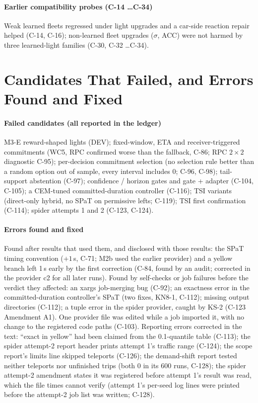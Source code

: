 \paragraph{Earlier compatibility probes (C-14 \dots C-34)} Weak learned fleets regressed under light upgrades and a car-side reaction repair
helped (C-14, C-16); non-learned fleet upgrades ($\sigma$, ACC) were not harmed by three learned-light families (C-30, C-32 \dots C-34).

\section{Candidates That Failed, and Errors Found and Fixed}\label{app:errors}
\paragraph{Failed candidates (all reported in the ledger)} M3-E reward-shaped lights (DEV); fixed-window, ETA and receiver-triggered
commitments (WC5, RPC confirmed worse than the fallback, C-86; RPC $2\times2$ diagnostic C-95); per-decision commitment selection (no
selection rule better than a random option out of sample, every interval includes 0; C-96, C-98); tail-support abstention (C-97);
confidence / horizon gates and gate + adapter (C-104, C-105); a CEM-tuned
committed-duration controller (C-116); TSI variants (direct-only hybrid, no SPaT on permissive lefts; C-119); TSI first confirmation
(C-114); spider attempts 1 and 2 (C-123, C-124).
\paragraph{Errors found and fixed} Found after results that used them, and disclosed with those results: the SPaT timing convention
($+1$\,s, C-71; M2b used the earlier provider) and a yellow branch left 1\,s early by the first correction (C-84, found by an audit;
corrected in the provider c2 for all later runs). Found by self-checks or job failures before the verdict they affected: an xargs job-merging bug (C-92); an exactness error in the committed-duration controller's SPaT (two fixes, KN8-1, C-112);
missing output directories (C-112); a tuple error in the spider provider, caught by KS-2 (C-123 Amendment A1). One provider file was edited
while a job imported it, with no change to the registered code paths (C-103).
Reporting errors corrected in the text: ``exact in yellow'' had been claimed from the 0.1-quantile table (C-113); the spider attempt-2
report header prints attempt 1's traffic range (C-124); the scope report's limits line skipped teleports (C-126); the demand-shift report tested neither teleports nor unfinished trips (both 0
in its 600 runs, C-128); the spider attempt-2 amendment states it was registered before attempt 1's result was read, which the file
times cannot verify (attempt 1's per-seed log lines were printed before the attempt-2 job list was written; C-128).
